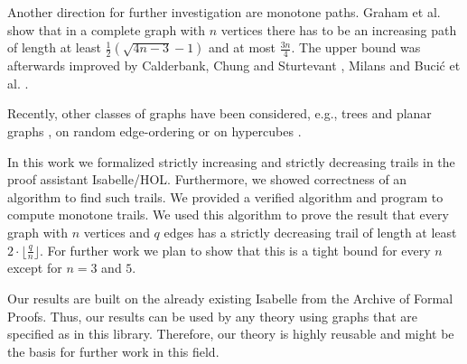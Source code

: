 \begin{isabellebody}
\begin{isamarkuptext}
Another direction for further investigation are monotone paths. 
Graham et al. \cite{graham1973increasing} show that in a complete graph with $n$ vertices there has to be an increasing path of length 
at least $\frac{1}{2}(\sqrt{4n-3}-1)$ and at most $\frac{3n}{4}$. 
The upper bound was afterwards improved by Calderbank, Chung and Sturtevant \cite{calderbank1984increasing}, 
Milans \cite{milans2015monotone} and Buci{\'c} et al. \cite{bucic2018nearly}. 

Recently, other classes of graphs have been considered, e.g., trees and planar graphs \cite{roditty2001monotone},
on random edge-ordering \cite{yuster2001large} or on hypercubes \cite{de2015increasing}.%
\end{isamarkuptext}\isamarkuptrue%
%
\isadelimdocument
%
\endisadelimdocument
%
\isatagdocument
%
\isamarkuptrue%
%
\endisatagdocument
{\isafolddocument}%
%
\isadelimdocument
%
\endisadelimdocument
%
\begin{isamarkuptext}%
In this work we formalized strictly increasing and strictly decreasing trails in the proof assistant Isabelle/HOL. 
Furthermore, we showed correctness of an algorithm to find such trails. We provided a verified algorithm and program to compute monotone trails. 
We used this algorithm to
prove the result that every graph with $n$ vertices and $q$ edges has a strictly decreasing trail of length at least
$2\cdot\lfloor\frac{q}{n}\rfloor$. For further work we plan to show that this is a tight bound for every $n$ except for $n = 3$ and $5$. 

Our results are built on the already existing Isabelle  from the Archive of Formal Proofs. 
Thus, our results can be used by any theory using graphs that are specified as in this library.
Therefore, our theory is highly reusable and might be the basis for further work in this field.%
\end{isamarkuptext}\isamarkuptrue%
%
\isadelimtheory
%
\endisadelimtheory
%
\isatagtheory
%
\endisatagtheory
{\isafoldtheory}%
%
\isadelimtheory
%
\endisadelimtheory
%
\end{isabellebody}%
\endinput
